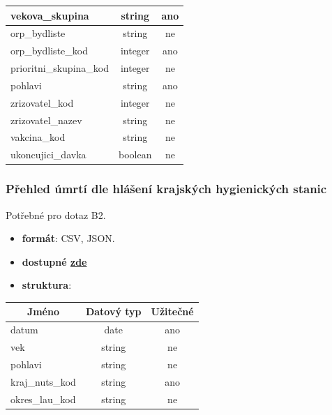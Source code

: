 \documentclass[12pt]{article}
\begin{document}
\begin{center}
\begin{tabular}{ |l|c|c| }
                \hline
                vekova\_skupina & string & ano \\
                \hline
                orp\_bydliste & string & ne \\
                \hline
                orp\_bydliste\_kod & integer & ano \\
                \hline
                prioritni\_skupina\_kod & integer & ne \\
                \hline
                pohlavi & string & ano \\
                \hline
                zrizovatel\_kod & integer & ne \\
                \hline
                zrizovatel\_nazev & string & ne \\
                \hline
                vakcina\_kod & string & ne \\
                \hline
                ukoncujici\_davka & boolean & ne \\
                \hline
            \end{tabular}
        \end{center}

\subsubsection*{Přehled úmrtí dle hlášení krajských hygienických stanic}
Potřebné pro dotaz B2.
\begin{itemize}
    \item \textbf{formát}: CSV, JSON.
    \item \textbf{dostupné \href{https://onemocneni-aktualne.mzcr.cz/api/v2/covid-19/umrti.csv}{zde}}
    \item \textbf{struktura}:
\end{itemize}
        \begin{center}
            \begin{tabular}{ |l|c|c| }
                \hline
                \multicolumn{1}{|c|}{Jméno} & Datový typ & Užitečné \\
                \hline
                \hline
                datum & date & ano \\
                \hline
                vek & string & ne \\
                \hline
                pohlavi & string & ne \\
                \hline
                kraj\_nuts\_kod & string & ano \\
                \hline
                okres\_lau\_kod & string & ne \\
                \hline
            \end{tabular}
        \end{center}
\end{document}
